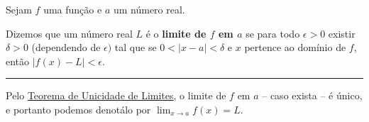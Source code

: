 \begin{definition}
	Sejam $f$ uma função e $a$ um número real.
	
	Dizemos que um número real $L$ é o \textbf{limite de $f$ em $a$} se para todo $\epsilon>0$ existir $\delta>0$ (dependendo de $\epsilon)$ tal que se $0<|x-a|<\delta$ e $x$ pertence ao domínio de $f$, então $|f(x)-L|<\epsilon$.
	
	\hrule
	
	Pelo \href{teo_unicidade_de_limite_moodle.html}{Teorema de Unicidade de Limites}, o limite de $f$ em $a$ -- caso exista -- é único, e portanto podemos denotálo por $\lim_{x\to a}f(x)=L$.
\end{definition}